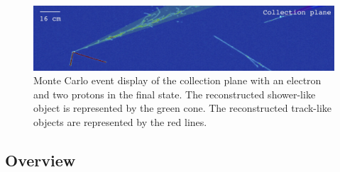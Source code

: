 \begin{figure}[htbp]
	\begin{center}
    	\includegraphics[width=0.8\linewidth]{figures/evd.jpg}
    	\caption{Monte Carlo event display of the collection plane with an electron and two protons in the final state. The reconstructed shower-like object is represented by the green cone. The reconstructed track-like objects are represented by the red lines.} \label{fig:evd}
	\end{center}
\end{figure}


\subsection{Overview}

